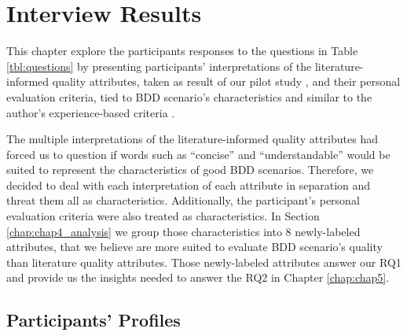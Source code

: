 \chapter{\label{chap:chap4}{Interview Results}}

This chapter explore the participants responses to the questions in Table \ref{tbl:questions} by presenting participants' interpretations of the literature-informed quality attributes, taken as result of our pilot study \cite{Refsq_2018}, and their personal evaluation criteria, tied to BDD scenario's characteristics and similar to the author's experience-based criteria \cite{Smart_2014}\cite{Wynne_and_Hellesoy_2012}.

The multiple interpretations of the literature-informed quality attributes had forced us to question if words such as ``concise'' and ``understandable'' would be suited to represent the characteristics of good BDD scenarios. Therefore, we decided to deal with each interpretation of each attribute in separation and threat them all as characteristics. Additionally, the participant's personal evaluation criteria were also treated as characteristics. In Section \ref{chap:chap4_analysis} we group those characteristics into 8 newly-labeled attributes, that we believe are more suited to evaluate BDD scenario's quality than literature quality attributes. Those newly-labeled attributes answer our RQ1 and provide us the insights needed to answer the RQ2 in Chapter \ref{chap:chap5}.

\section{\label{chap:chap4_profile}Participants' Profiles}

